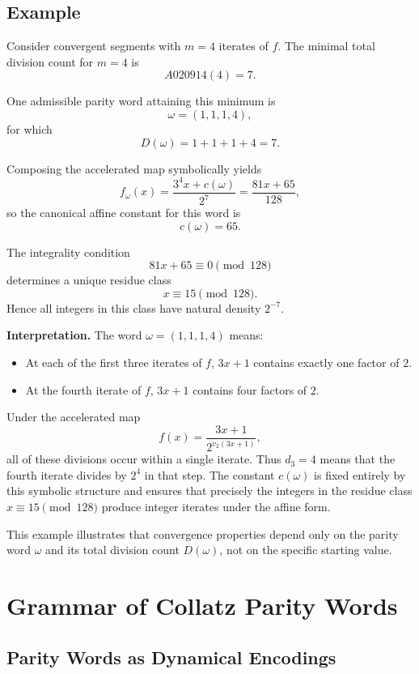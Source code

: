\documentclass[12pt, oneside]{article}   	%
\numberwithin{equation}{section}          %
\theoremstyle{definition}
\begin{document}
\subsection{Example}

Consider convergent segments with $m=4$ iterates of $f$.  
The minimal total division count for $m=4$ is
\[
A020914(4) = 7.
\]

One admissible parity word attaining this minimum is
\[
\omega = (1,1,1,4),
\]
for which
\[
D(\omega) = 1+1+1+4 = 7.
\]

Composing the accelerated map symbolically yields
\[
f_\omega(x)=\frac{3^4 x + c(\omega)}{2^7}
           = \frac{81x + 65}{128},
\]
so the canonical affine constant for this word is
\[
c(\omega)=65.
\]

The integrality condition
\[
81x + 65 \equiv 0 \pmod{128}
\]
determines a unique residue class
\[
x \equiv 15 \pmod{128}.
\]
Hence all integers in this class have natural density $2^{-7}$.

\medskip

\noindent
\textbf{Interpretation.}
The word $\omega = (1,1,1,4)$ means:

\begin{itemize}
    \item At each of the first three iterates of $f$, $3x+1$ contains exactly one factor of $2$.
    \item At the fourth iterate of $f$, $3x+1$ contains four factors of $2$.
\end{itemize}

Under the accelerated map
\[
f(x)=\frac{3x+1}{2^{v_2(3x+1)}},
\]
all of these divisions occur within a single iterate. Thus $d_3=4$ means that
the fourth iterate divides by $2^4$ in that step. The constant $c(\omega)$ is
fixed entirely by this symbolic structure and ensures that precisely the
integers in the residue class $x \equiv 15 \pmod{128}$ produce integer iterates
under the affine form.

\medskip

This example illustrates that convergence properties depend only on the parity
word $\omega$ and its total division count $D(\omega)$, not on the specific
starting value.


\newpage
\section{Grammar of Collatz Parity Words}
\label{sec:grammar}

\subsection{Parity Words as Dynamical Encodings}
\end{document}
